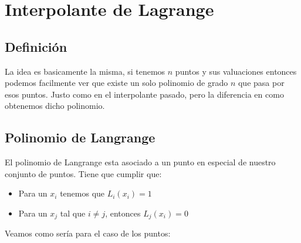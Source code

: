 \documentclass[12pt, fleqn]{report}                             %
\theoremstyle{break}                                            %
\begin{document}
    \chapter{Interpolante de Lagrange}

        \clearpage
        \section{Definición}

            La idea es basicamente la misma, si tenemos $n$ puntos y sus valuaciones entonces
            podemos facilmente ver que existe un solo polinomio de grado $n$ que pasa por esos
            puntos. Justo como en el interpolante pasado, pero la diferencia en como obtenemos dicho
            polinomio.

        \section{Polinomio de Langrange}

            El polinomio de Langrange esta asociado a un punto en especial de nuestro conjunto
            de puntos. Tiene que cumplir que:
            \begin{itemize}
                \item Para un $x_i$ tenemos que $L_i(x_i) = 1$
                \item Para un $x_j$ tal que $i \neq j$, entonces $L_j(x_i) = 0$
            \end{itemize}

            Veamos como sería para el caso de los puntos:
\end{document}
